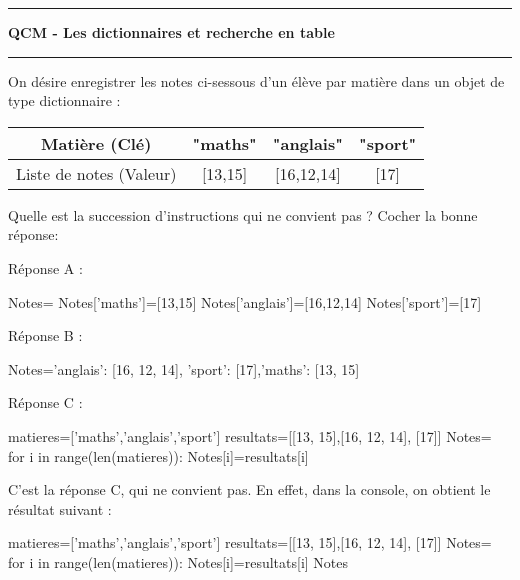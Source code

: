 \documentclass[a4paper,12,answers]{exam}
\begin{document}
\chead{}

\lfoot{                      }
\hrule
\begin{center}
	\textbf{\Large{QCM - Les dictionnaires et recherche en table }}\end{center}
\hrule
\vskip0.5cm
	\begin{questions}
		\question On désire enregistrer les notes ci-sessous d'un élève par matière dans un objet de type dictionnaire : 
		\begin{center}
		\begin{tabular}{|c|c|c|c|}
		\hline
		Matière (Clé) & "maths"&"anglais"&"sport"\\
		\hline
		 Liste de notes (Valeur)&[13,15] &[16,12,14]&[17]\\
		 \hline
		\end{tabular}
	\end{center}
		Quelle est la succession d'instructions qui ne convient pas ?
		Cocher la bonne réponse:
		\begin{checkboxes}
			\choice Réponse A : 
\begin{pyverbatim}
Notes={}
Notes['maths']=[13,15]
Notes['anglais']=[16,12,14]
Notes['sport']=[17]
\end{pyverbatim}
\choice Réponse B :
\begin{pyverbatim}
Notes={'anglais': [16, 12, 14], 'sport': [17],'maths': [13, 15]}
\end{pyverbatim}
\choice Réponse C :
\begin{pyverbatim}
matieres=['maths','anglais','sport']
resultats=[[13, 15],[16, 12, 14], [17]]
Notes={}
for i in range(len(matieres)):
	Notes[i]=resultats[i]
\end{pyverbatim}
\end{checkboxes}		

\begin{solution}
C'est la réponse C, qui ne convient pas. En effet, dans la console, on obtient le résultat suivant :
\begin{pyconsole}
matieres=['maths','anglais','sport']
resultats=[[13, 15],[16, 12, 14], [17]]
Notes={}
for i in range(len(matieres)):
	Notes[i]=resultats[i]
Notes
\end{pyconsole}
\end{solution}


\end{questions}
\end{document}
